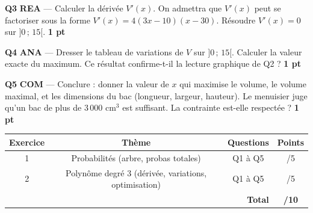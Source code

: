 \documentclass[a4paper,11pt]{article}
\newcommand{\pts}[1]{\hfill\textcolor{gris}{\small\textbf{#1}}}
\newcommand{\comp}[1]{\colorbox{blue!10}{\scriptsize\textbf{#1}}}
\begin{document}
\textbf{Q3} \comp{REA} — Calculer la dérivée $V'(x)$. On admettra que $V'(x)$ peut se factoriser sous la forme $V'(x) = 4(3x - 10)(x - 30)$. Résoudre $V'(x) = 0$ sur $]0\,;\,15[$. \pts{1 pt}

\begin{reponsebox}[3.5cm]
\dotfill

\dotfill

\dotfill

\dotfill
\end{reponsebox}

\textbf{Q4} \comp{ANA} — Dresser le tableau de variations de $V$ sur $]0\,;\,15[$. Calculer la valeur exacte du maximum. Ce résultat confirme-t-il la lecture graphique de Q2 ? \pts{1 pt}

\begin{reponsebox}[4.5cm]
\dotfill

\dotfill

\dotfill

\dotfill

\dotfill
\end{reponsebox}

\textbf{Q5} \comp{COM} — Conclure : donner la valeur de $x$ qui maximise le volume, le volume maximal, et les dimensions du bac (longueur, largeur, hauteur). Le menuisier juge qu'un bac de plus de 3\,000 cm$^3$ est suffisant. La contrainte est-elle respectée ? \pts{1 pt}

\begin{reponsebox}[4cm]
\dotfill

\dotfill

\dotfill

\dotfill

\dotfill
\end{reponsebox}

\vfill

\begin{center}
\begin{tabular}{|c|c|c|c|}
\hline
\textbf{Exercice} & \textbf{Thème} & \textbf{Questions} & \textbf{Points} \\
\hline
1 & Probabilités (arbre, probas totales) & Q1 à Q5 & /5 \\
\hline
2 & Polynôme degré 3 (dérivée, variations, optimisation) & Q1 à Q5 & /5 \\
\hline
\multicolumn{3}{|r|}{\textbf{Total}} & \textbf{/10} \\
\hline
\end{tabular}
\end{center}
\end{document}
